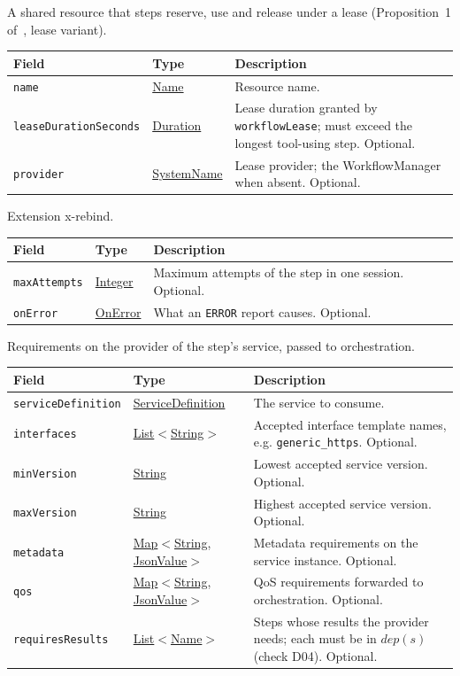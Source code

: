 \documentclass[a4paper]{arrowhead}
\newcommand{\mref}[1]{{\textcolor{ArrowheadPurple}{\hyperref[sec:model:#1]{#1}}}}
\newcommand{\pref}[1]{{\textcolor{ArrowheadGrey}{\hyperref[sec:model:primitives:#1]{#1}}}}
\begin{document}
A shared resource that steps reserve, use and release under a lease (Proposition~1 of~\cite{varga2026}, lease variant).

{\small
\begin{longtable}{|p{3.9cm}|p{4.4cm}|p{7.5cm}|}

\hline
\rowcolor{gray!33} Field & Type & Description \\ \hline
\endhead
\texttt{name} & \pref{Name} & Resource name. \\ \hline
\texttt{leaseDurationSeconds} & \pref{Duration} & Lease duration granted by \texttt{workflowLease}; must exceed the longest tool-using step. Optional. \\ \hline
\texttt{provider} & \pref{SystemName} & Lease provider; the WorkflowManager when absent. Optional. \\ \hline
\end{longtable}
}

Extension x-rebind.

{\small
\begin{longtable}{|p{3.9cm}|p{4.4cm}|p{7.5cm}|}

\hline
\rowcolor{gray!33} Field & Type & Description \\ \hline
\endhead
\texttt{maxAttempts} & \pref{Integer} & Maximum attempts of the step in one session. Optional. \\ \hline
\texttt{onError} & \mref{OnError} & What an \texttt{ERROR} report causes. Optional. \\ \hline
\end{longtable}
}

Requirements on the provider of the step's service, passed to orchestration.

{\small
\begin{longtable}{|p{3.9cm}|p{4.4cm}|p{7.5cm}|}

\hline
\rowcolor{gray!33} Field & Type & Description \\ \hline
\endhead
\texttt{serviceDefinition} & \pref{ServiceDefinition} & The service to consume. \\ \hline
\texttt{interfaces} & \pref{List}$<$\pref{String}$>$ & Accepted interface template names, e.g. \texttt{generic\_https}. Optional. \\ \hline
\texttt{minVersion} & \pref{String} & Lowest accepted service version. Optional. \\ \hline
\texttt{maxVersion} & \pref{String} & Highest accepted service version. Optional. \\ \hline
\texttt{metadata} & \pref{Map}$<$\pref{String}, \pref{JsonValue}$>$ & Metadata requirements on the service instance. Optional. \\ \hline
\texttt{qos} & \pref{Map}$<$\pref{String}, \pref{JsonValue}$>$ & QoS requirements forwarded to orchestration. Optional. \\ \hline
\texttt{requiresResults} & \pref{List}$<$\pref{Name}$>$ & Steps whose results the provider needs; each must be in $dep(s)$ (check D04). Optional. \\ \hline
\end{longtable}
}
\end{document}
